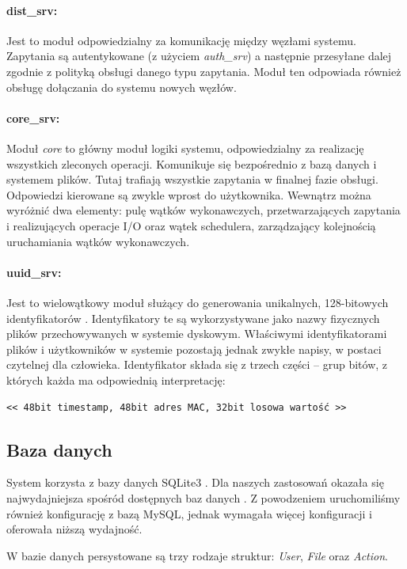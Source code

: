 \paragraph{dist\_srv:} Jest to moduł odpowiedzialny za komunikację między węzłami systemu. Zapytania są autentykowane (z użyciem \textit{auth\_srv}) a następnie przesyłane dalej zgodnie z polityką obsługi danego typu zapytania. Moduł ten odpowiada również obsługę dołączania do systemu nowych węzłów.

\paragraph{core\_srv:} Moduł \textit{core} to główny moduł logiki systemu, odpowiedzialny za realizację wszystkich zleconych operacji. Komunikuje się bezpośrednio z bazą danych i systemem plików. Tutaj trafiają wszystkie zapytania w finalnej fazie obsługi. Odpowiedzi kierowane są zwykle wprost do użytkownika. Wewnątrz można wyróżnić dwa elementy: pulę wątków wykonawczych, przetwarzających zapytania i realizujących operacje I/O oraz wątek schedulera, zarządzający kolejnością uruchamiania wątków wykonawczych.

\paragraph{uuid\_srv:} Jest to wielowątkowy moduł służący do generowania unikalnych, 128-bitowych identyfikatorów \cite{snowflake}. Identyfikatory te są wykorzystywane jako nazwy fizycznych plików przechowywanych w systemie dyskowym. Właściwymi identyfikatorami plików i użytkowników w systemie pozostają jednak zwykłe napisy, w postaci czytelnej dla człowieka. Identyfikator składa się z trzech części – grup bitów, z których każda ma odpowiednią interpretację:
\centerline{\texttt{<< 48bit timestamp, 48bit adres MAC, 32bit losowa wartość >>}}

\subsection{Baza danych}
System korzysta z bazy danych SQLite3 \cite{sqlite-www}. Dla naszych zastosowań okazała się najwydajniejsza spośród dostępnych baz danych \cite{sqlite-perf}. Z powodzeniem uruchomiliśmy również konfigurację z bazą MySQL, jednak wymagała więcej konfiguracji i oferowała niższą wydajność.

W bazie danych persystowane są trzy rodzaje struktur: \textit{User}, \textit{File} oraz \textit{Action}.


